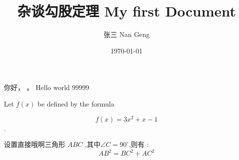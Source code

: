 \documentclass{ctexart}  %
\title{\heiti  杂谈勾股定理 My first Document}
\author{\kaishu  张三 Nan Geng}
\date{\today}
\newcommand\degree{^\circ}
\begin{document}
	\maketitle
	你好， \LaTeXe 。
	Hello world  99999
	
	Let $f(x) $ be defined by the formula 
	
	$$f(x) =3x^2+x- 1 $$.
	
	设置直接哦啊三角形  $ABC$ ,其中$\angle
	C=90\degree$,则有 :
	\begin{equation}
	AB^2=BC^2+AC^2 
	\end{equation}
	
\end{document}
